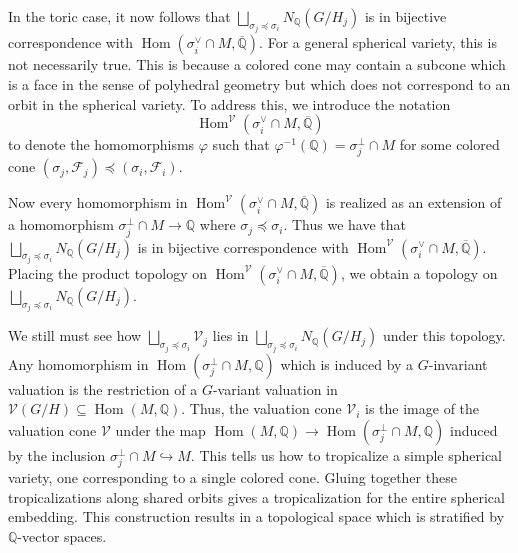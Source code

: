 \documentclass[12pt,twoside,cd]{amsart}
\theoremstyle{definition}
\begin{document}
In the toric case, it now follows that $\bigsqcup_{\sigma_j \preceq \sigma_i} N_\mathbb{Q}(G/H_j)$ is in bijective correspondence with ${\operatorname{Hom}}{(\sigma_i^\vee \cap M, \overline{\mathbb{Q}})}$.
For a general spherical variety, this is not necessarily true. 
This is because a colored cone may contain a subcone which is a face in the sense of polyhedral geometry but which does not correspond to an orbit in the spherical variety. 
To address this, we introduce the notation
\[
{\operatorname{Hom}}^\mathcal{V}{(\sigma_i^\vee \cap M, \overline{\mathbb{Q}})}
\]
to denote the homomorphisms $\varphi$ such that $\varphi^{-1}(\mathbb{Q}) = \sigma_j^\perp \cap M$ for some colored cone $(\sigma_j,\mathcal{F}_j) \preceq (\sigma_i,\mathcal{F}_i)$.

Now every homomorphism in ${\operatorname{Hom}}^\mathcal{V}{(\sigma_i^\vee \cap M,\overline{\mathbb{Q}})}$ is realized as an extension of a homomorphism $\sigma_j^\perp \cap M \rightarrow \mathbb{Q}$ where $\sigma_j \preceq \sigma_i$. 
Thus we have that $\bigsqcup_{\sigma_j \preceq \sigma_i} N_\mathbb{Q}(G/H_j)$ is in bijective correspondence with ${\operatorname{Hom}}^\mathcal{V}{(\sigma_i^\vee \cap M, \overline{\mathbb{Q}})}$.
Placing the product topology on ${\operatorname{Hom}}^\mathcal{V}{(\sigma_i^\vee \cap M, \overline{\mathbb{Q}})}$, we obtain a topology on $\bigsqcup_{\sigma_j \preceq \sigma_i} N_\mathbb{Q}(G/H_j)$.

We still must see how $\bigsqcup_{\sigma_j \preceq \sigma_i} \mathcal{V}_j$ lies in $\bigsqcup_{\sigma_j \preceq \sigma_i} N_\mathbb{Q}(G/H_j)$ under this topology.
Any homomorphism in ${\operatorname{Hom}}{(\sigma_j^\perp \cap M,\mathbb{Q})}$ which is induced by a $G$-invariant valuation is the restriction of a $G$-variant valuation in $\mathcal{V}(G/H) \subseteq {\operatorname{Hom}}{(M,\mathbb{Q})}$.
Thus, the valuation cone $\mathcal{V}_i$ is the image of the valuation cone $\mathcal{V}$ under the map ${\operatorname{Hom}}{(M,\mathbb{Q})} \rightarrow {\operatorname{Hom}}{(\sigma_j^\perp \cap M,\mathbb{Q})}$ induced by the inclusion $\sigma_j^\perp \cap M \hookrightarrow M$.
This tells us how to tropicalize a simple spherical variety, one corresponding to a single colored cone. 
Gluing together these tropicalizations along shared orbits gives a tropicalization for the entire spherical embedding.
This construction results in a topological space which is stratified by $\mathbb{Q}$-vector spaces.
\end{document}
